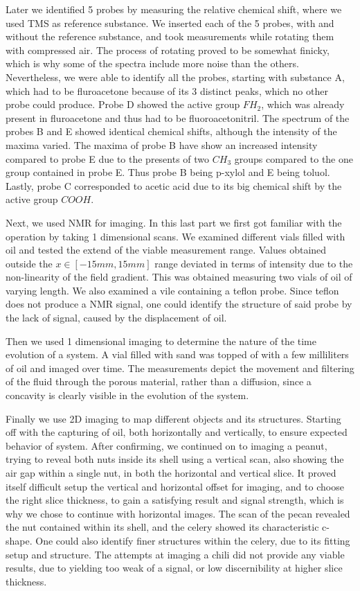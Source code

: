 \documentclass[11 pt]{article}
\begin{document}
 Later we identified 5 probes by measuring the relative chemical shift, where we used TMS as reference substance.
 We inserted each of the 5 probes, with and without the reference substance, and took measurements while rotating them with compressed air. The process of rotating proved to be somewhat finicky, which is why some of the spectra include more noise than the others. Nevertheless, we were able to identify all the probes, starting with substance A, which had to be fluroacetone because of its 3 distinct peaks, which no other probe could produce. Probe D showed the active group $FH_2$, which was already present in fluroacetone and thus had to be fluoroacetonitril. The spectrum of the probes B and E showed identical chemical shifts, although the intensity of the maxima varied. The maxima of probe B have show an increased intensity compared to probe E due to the presents of two $CH_3$ groups compared to the one group contained in probe E. Thus probe B being p-xylol and E being toluol. Lastly, probe C corresponded to acetic acid due to its big chemical shift by the active group $COOH$.



  Next, we used NMR for imaging. In this last part we first got familiar with the operation by taking 1 dimensional scans. 
We examined different vials filled with oil and tested the extend of the viable measurement range. Values obtained outside the $x\in\left[-15mm, 15mm\right]$ range deviated in terms of intensity due to the non-linearity of the field gradient. This was obtained measuring two vials of oil of varying length. We also examined a vile containing a teflon probe. Since teflon does not produce a NMR signal, one could identify the structure of said probe by the lack of signal, caused by the displacement of oil.
  
Then we used 1 dimensional imaging to determine the nature of the time evolution of a system. A vial filled with sand was topped of with a few milliliters of oil and imaged over time. The measurements depict the movement and filtering of the fluid through the porous material, rather than a diffusion, since a concavity is clearly visible in the evolution of the system.

 
Finally we use 2D imaging to map different objects and its structures. Starting off with the capturing  of  oil, both horizontally and vertically, to ensure expected behavior of system. After confirming, we continued on to imaging a peanut, trying to reveal both nuts inside its shell using a vertical scan, also showing the air gap within a single nut, in both the horizontal and vertical slice.
It proved itself difficult setup the vertical and horizontal offset for imaging, and to choose the right slice thickness, to gain a satisfying result and signal strength, which is why we chose to continue with horizontal images. The scan of the pecan revealed the nut contained within its shell, and the celery showed its characteristic c-shape. One could also identify finer structures within the celery, due to its fitting setup and structure.
The attempts at imaging a chili did not provide any viable results, due to yielding too weak of a signal, or low discernibility at higher slice thickness.
\end{document}
